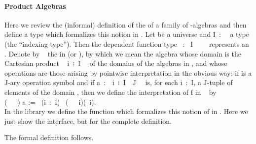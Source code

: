 \paragraph*{Product Algebras}
Here we review the (informal) definition of the  of a family of
-algebras and then define a type which formalizes this notion in \agda.
Let  be a universe and \ab I~:~~ a type (the ``indexing type'').
Then the dependent function type ~:~\ab
I~~~~ represents an .
Denote by ~ the  in  (or ), by which we mean the algebra whose domain is the Cartesian product ~\ab
i~꞉~\ab I~\af{,}~ of the domains of the algebras in , and
whose operations are those arising by pointwise interpretation in the obvious way: if
 is a \ab J-ary operation symbol and if
\ab a~:~~\ab i~꞉~\ab I~\af{,}~\ab J~~ is, for each
\ab i~:~\ab I, a \ab J-tuple of elements of the domain , then
we define the interpretation of \ab f in ~ by\\[-2mm]

(~~~) \ab a := ~(\ab i~:~\ab I)~
(~~~\ab i)(~\ab i).\\[8pt]
In the \agdaalgebras library we define the function  which formalizes this
notion of  in \mltt.
\ifshort
Here we just show the interface, but \seeshort for the complete definition.

\else
The formal definition follows.

